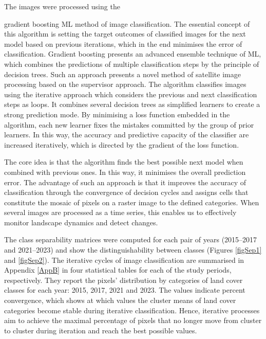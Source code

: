 \documentclass[jimaging,article,accept,pdftex,moreauthors]{Definitions/mdpi}
\begin{document}
{The} images were{ }processed using the {gradient boosting ML {method of image} classification. The essential concept of this algorithm is setting the target outcomes of classified images for the next model based on previous iterations, which in the end minimises the error of classification. Gradient boosting presents an advanced ensemble technique {of ML, }which combines the predictions of multiple classification steps by the principle of decision trees. Such an approach presents a novel method of satellite image processing{ }based on the supervisor approach. {The} algorithm{ }classifies{ }images using the iterative approach which considers the previous and next classification steps as loops. {It} combines several decision trees as{ }simplified learners to create a strong prediction mode{. }By minimising a loss function embedded in the algorithm, each new learner{ fixes} the mistakes committed by the group of prior learners. In this way, the accuracy and predictive capacity{ of the classifier} are increased {iteratively}, which is directed by the gradient of the loss function. 

{The core idea is that} the algorithm finds the best possible next model when combined with previous {ones}. In this way, it minimises the overall prediction error. The advantage of such an approach is that it {improves the accuracy of classification} through the convergence of decision{ }cycles and assigns cells that constitute the mosaic of pixels on{ }a raster image to the defined {categories}. When several {images are processed as a time series}, this enables us to effectively monitor landscape dynamics and detect{ changes}. 

The class separability matrices were computed for each pair of years (2015--2017 and 2021--2023) and show the distinguishability between classes (Figures \ref{figSep1} and \ref{figSep2}). The iterative cycles of image classification are summarised in  Appendix \ref{AppB} in four statistical tables for each of the study periods, respectively. {They report the pixels' distribution by categories of land cover classes for each year: 2015, 2017, 2021 and 2023. The values indicate percent convergence,{ which shows at which values the cluster means of land cover categories become stable during iterative classification}. %
Hence, iterative processes aim to achieve the maximal percentage of pixels that no longer move from cluster to cluster during iteration and reach the best possible values.} 

}
\end{document}
